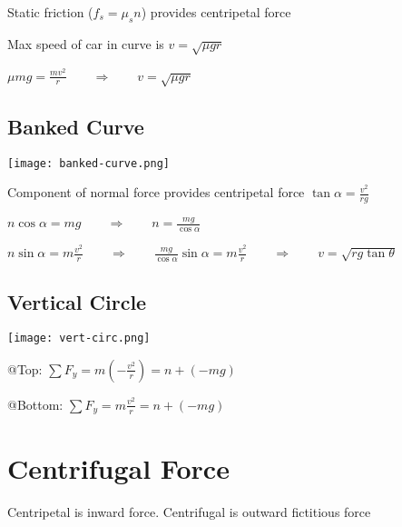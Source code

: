\documentclass[12pt]{article}
\begin{document}
\begin{spacing}{1.5}
\begin{itemize*}
	\item Static friction ($f_s = \mu_s n$) provides centripetal force
	\item Max speed of car in curve is $v = \sqrt{\mu g r}$
		\begin{itemize*}
			\item $\mu mg = \frac{mv^2}{r} \qquad \Rightarrow \qquad v = \sqrt{\mu g r}$
		\end{itemize*}
\end{itemize*}

\subsection{Banked Curve}

\texttt{[image: banked-curve.png]}

\begin{itemize*}
	\item Component of normal force provides centripetal force $\tan{\alpha} = \frac{v^2}{rg}$ 
		\begin{itemize*}
			\item $n \cos{\alpha} = mg \qquad \Rightarrow \qquad n = \frac{mg}{\cos{\alpha}}$
			\item $n \sin{\alpha} = m \frac{v^2}{r} \qquad \Rightarrow \qquad \frac{mg}{\cos{\alpha}} \sin{\alpha} = m \frac{v^2}{r} \qquad \Rightarrow \qquad v = \sqrt{rg \tan{\theta}}$
		\end{itemize*}
\end{itemize*}

\subsection{Vertical Circle}

\texttt{[image: vert-circ.png]}

\begin{itemize*}
	\item @Top: $\sum F_y = m (-\frac{v^2}{r}) = n + (-mg)$
	\item @Bottom: $\sum F_y = m \frac{v^2}{r} = n + (-mg)$
\end{itemize*}

\section{Centrifugal Force}

Centripetal is inward force. Centrifugal is outward fictitious force

\end{spacing}
\end{document}
